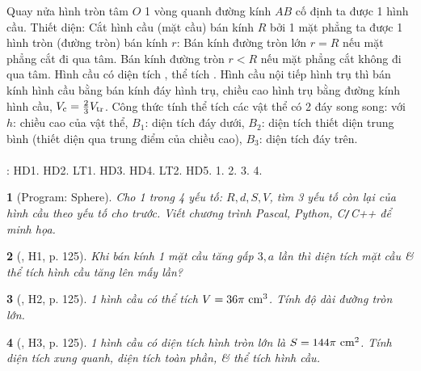\documentclass{article}
\newtheorem{baitoan}{}
\begin{document}
\begin{center}
\end{center}
 Quay nửa hình tròn tâm $O$ 1 vòng quanh đường kính $AB$ cố định ta được 1 hình cầu.  {\sf Thiết diện}: Cắt hình cầu (mặt cầu) bán kính $R$ bởi 1 mặt phẳng ta được 1 hình tròn (đường tròn) bán kính $r$: Bán kính đường tròn lớn $r = R$ nếu mặt phẳng cắt đi qua tâm. Bán kính đường tròn $r < R$ nếu mặt phẳng cắt không đi qua tâm.  Hình cầu có diện tích , thể tích .  Hình cầu nội tiếp hình trụ thì bán kính hình cầu bằng bán kính đáy hình trụ, chiều cao hình trụ bằng đường kính hình cầu, $V_{\rm c} = \frac{2}{3}V_{\rm tr}$.  {\sf Công thức tính thể tích các vật thể có 2 đáy song song}:  với $h$: chiều cao của vật thể, $B_1$: diện tích đáy dưới, $B_2$: diện tích thiết diện trung bình (thiết diện qua trung điểm của chiều cao), $B_3$: diện tích đáy trên.\\
\\
\cite[Chap. X, \S3, pp. 104--108]{SGK_Toan_9_Canh_Dieu_tap_1}: HD1. HD2. LT1. HD3. HD4. LT2. HD5. 1. 2. 3. 4.

\begin{baitoan}[{\sf Program}: Sphere]
	Cho 1 trong 4 yếu tố: $R,d,S,V$, tìm 3 yếu tố còn lại của hình cầu theo yếu tố cho trước. Viết chương trình {\sf Pascal, Python, C{\tt/}C++} để minh họa.
\end{baitoan}

\begin{baitoan}[\cite{Binh_boi_duong_Toan_9_tap_2}, H1, p. 125]
	Khi bán kính 1 mặt cầu tăng gấp $3,a$ lần thì diện tích mặt cầu \& thể tích hình cầu tăng lên mấy lần?
\end{baitoan}

\begin{baitoan}[\cite{Binh_boi_duong_Toan_9_tap_2}, H2, p. 125]
	1 hình cầu có thể tích $V = 36\pi\ {\rm cm}^3$. Tính độ dài đường tròn lớn.
\end{baitoan}

\begin{baitoan}[\cite{Binh_boi_duong_Toan_9_tap_2}, H3, p. 125]
	1 hình cầu có diện tích hình tròn lớn là $S = 144\pi\ {\rm cm}^2$. Tính diện tích xung quanh, diện tích toàn phần, \& thể tích hình cầu.
\end{baitoan}
\end{document}
